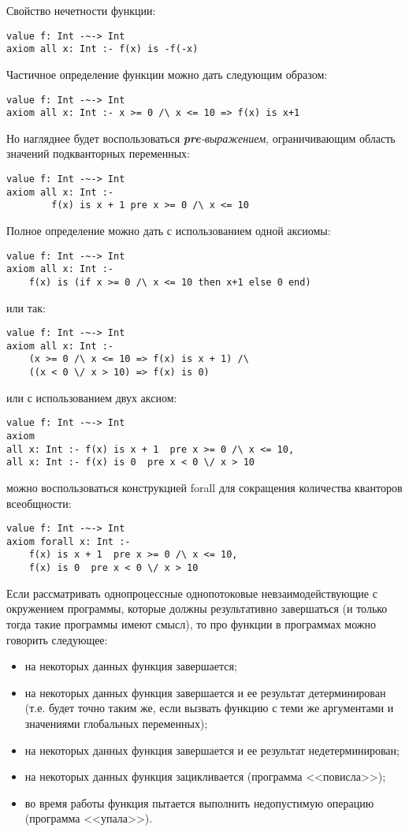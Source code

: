 Свойство нечетности функции:
\begin{lstlisting}
value f: Int -~-> Int
axiom all x: Int :- f(x) is -f(-x)
\end{lstlisting}

Частичное определение функции можно дать следующим образом:
\begin{lstlisting}
value f: Int -~-> Int
axiom all x: Int :- x >= 0 /\ x <= 10 => f(x) is x+1
\end{lstlisting}

Но нагляднее будет воспользоваться \emph{\textbf{pre}-выражением}, ограничивающим область значений подкванторных переменных:
\begin{lstlisting}
value f: Int -~-> Int
axiom all x: Int :-
        f(x) is x + 1 pre x >= 0 /\ x <= 10
\end{lstlisting}

Полное определение можно дать с использованием одной аксиомы:
\begin{lstlisting}
value f: Int -~-> Int
axiom all x: Int :-
    f(x) is (if x >= 0 /\ x <= 10 then x+1 else 0 end)
\end{lstlisting}

или так:

\begin{lstlisting}
value f: Int -~-> Int
axiom all x: Int :-
    (x >= 0 /\ x <= 10 => f(x) is x + 1) /\
    ((x < 0 \/ x > 10) => f(x) is 0)
\end{lstlisting}

или с использованием двух аксиом:
\begin{lstlisting}
value f: Int -~-> Int
axiom
all x: Int :- f(x) is x + 1  pre x >= 0 /\ x <= 10,
all x: Int :- f(x) is 0  pre x < 0 \/ x > 10
\end{lstlisting}

можно воспользоваться конструкцией forall для сокращения количества кванторов всеобщности:
\begin{lstlisting}
value f: Int -~-> Int
axiom forall x: Int :-
    f(x) is x + 1  pre x >= 0 /\ x <= 10,
    f(x) is 0  pre x < 0 \/ x > 10
\end{lstlisting}


Если рассматривать однопроцессные однопотоковые невзаимодействующие с окружением программы, которые должны результативно завершаться (и только тогда такие программы имеют смысл), то про функции в программах можно говорить следующее:
\begin{itemize}
  \item на некоторых данных функция завершается;
  \item на некоторых данных функция завершается и ее результат детерминирован (т.е. будет точно таким же, если вызвать функцию с теми же аргументами и значениями глобальных переменных);
  \item на некоторых данных функция завершается и ее результат недетерминирован;
  \item на некоторых данных функция зацикливается (программа <<повисла>>);
  \item во время работы функция пытается выполнить недопустимую операцию (программа <<упала>>).
\end{itemize}

